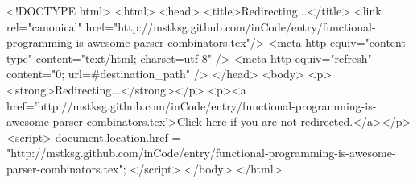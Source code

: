 <!DOCTYPE html>
<html>
<head>
<title>Redirecting...</title>
<link rel="canonical" href="http://mstksg.github.com/inCode/entry/functional-programming-is-awesome-parser-combinators.tex"/>
<meta http-equiv="content-type" content="text/html; charset=utf-8" />
<meta http-equiv="refresh" content="0; url=#{destination_path}" />
</head>
<body>
  <p><strong>Redirecting...</strong></p>
  <p><a href='http://mstksg.github.com/inCode/entry/functional-programming-is-awesome-parser-combinators.tex'>Click here if you are not redirected.</a></p>
  <script>
    document.location.href = "http://mstksg.github.com/inCode/entry/functional-programming-is-awesome-parser-combinators.tex";
  </script>
</body>
</html>
